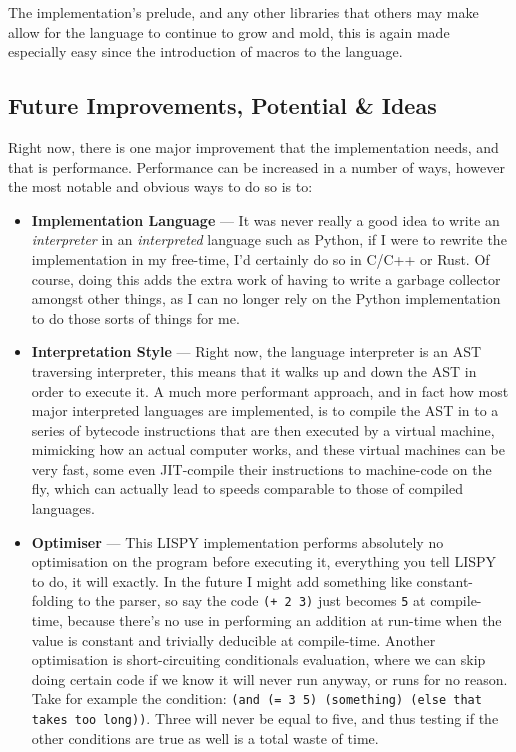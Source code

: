 \documentclass{article}
\newcommand{\code}[1]{\texttt{#1}}
\begin{document}
    The implementation's prelude, and any other libraries that others
    may make allow for the language to continue to grow and mold, this is
    again made especially easy since the introduction of macros to the language.

  \subsection{Future Improvements, Potential \& Ideas}
    Right now, there is one major improvement that the implementation needs,
    and that is performance.  Performance can be increased in a number of ways,
    however the most notable and obvious ways to do so is to:
    \begin{itemize}
      \item \textbf{Implementation Language} --- It was never really a good idea
      to write an \emph{interpreter} in an \emph{interpreted} language such as
      Python, if I were to rewrite the implementation in my free-time, I'd
      certainly do so in C/C++ or Rust. Of course, doing this adds the extra work
      of having to write a garbage collector amongst other things, as I can no
      longer rely on the Python implementation to do those sorts of things
      for me.
      \item \textbf{Interpretation Style} --- Right now, the language interpreter
      is an AST traversing interpreter, this means that it walks up and down
      the AST in order to execute it. A much more performant approach,
      and in fact how most major interpreted languages are implemented, is to
      compile the AST in to a series of bytecode instructions that are then
      executed by a virtual machine, mimicking how an actual computer works,
      and these virtual machines can be very fast, some even JIT-compile their
      instructions to machine-code on the fly, which can actually lead to speeds
      comparable to those of compiled languages.
      \item \textbf{Optimiser} --- This LISPY implementation performs absolutely
      no optimisation on the program before executing it, everything you tell
      LISPY to do, it will exactly.  In the future I might add something like
      constant-folding to the parser, so say the code \code{(+ 2 3)} just becomes
      \code{5} at compile-time, because there's no use in performing an addition
      at run-time when the value is constant and trivially deducible at compile-time.
      Another optimisation is short-circuiting conditionals evaluation, where
      we can skip doing certain code if we know it will never run anyway, or runs
      for no reason. Take for example the condition:
      \code{(and (= 3 5) (something) (else that takes too long))}.
      Three will never be equal to five, and thus testing if the other
      conditions are true as well is a total waste of time.
    \end{itemize}
\end{document}
